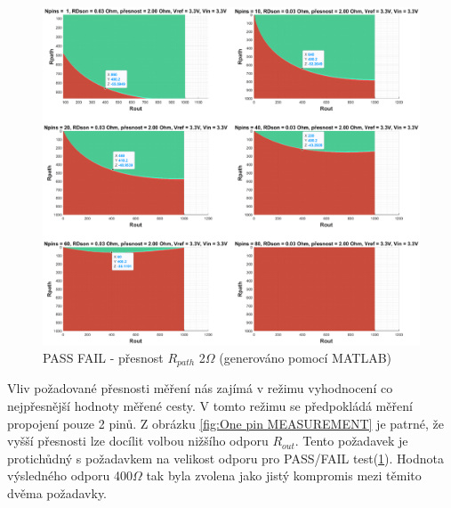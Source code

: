 \begin{figure}[ht!]
    \centering
    \includegraphics[width = 1\textwidth]{obrazky/PASS_FAIL_MERENI.eps}
    \caption{PASS FAIL -  přesnost $R_{path}$ 2$\Omega$ (generováno pomocí MATLAB)}
    \label{fig:PASS_FAIL 2 OHMS MEASUREMENT}
\end{figure}

\clearpage
Vliv požadované přesnosti měření nás zajímá v režimu vyhodnocení co nejpřesnější hodnoty měřené cesty.
V tomto režimu se předpokládá měření propojení pouze 2 pinů.
Z obrázku \ref{fig:One pin MEASUREMENT} je patrné, že vyšší přesnosti lze docílit volbou nižšího odporu $R_{out}$.
Tento požadavek je protichůdný s požadavkem na velikost odporu pro PASS/FAIL test(\ref{fig:PASS_FAIL 2 OHMS MEASUREMENT}).
Hodnota výsledného odporu 400$\Omega$ tak byla zvolena jako jistý kompromis mezi těmito dvěma požadavky.


